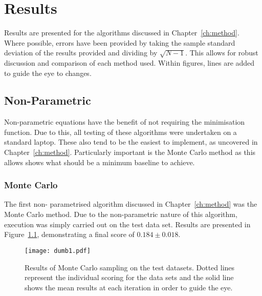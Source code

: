 \chapter{Results}










\graphicspath{{Chapter4/Figs/Vector/}{Chapter4/Figs/}}
Results are presented for the algorithms discussed in Chapter~\ref{ch:method}. Where possible, errors have been provided by taking the sample standard deviation of the results provided and dividing by $\sqrt{N-1}$. This allows for robust discussion and comparison of each method used. Within figures, lines are added to guide the eye to changes.

\section{Non-Parametric}
Non-parametric equations have the benefit of not requiring the minimisation function. Due to this, all testing of these algorithms were undertaken on a standard laptop. These also tend to be the easiest to implement, as uncovered in Chapter~\ref{ch:method}. Particularly important is the Monte Carlo method as this allows shows what should be a minimum baseline to achieve.

\subsection{Monte Carlo}
The first non- parametrised algorithm discussed in Chapter~\ref{ch:method} was the Monte Carlo method. Due to the non-parametric nature of this algorithm, execution was simply carried out on the test data set. Results are presented in Figure~\ref{fig:MCTestSet}, demonstrating a final score of ${0.184\pm{}0.018}$.

\begin{figure}[H]
    \begin{center}
        \texttt{[image: dumb1.pdf]}
        \caption[Monte Carlo]{Results of Monte Carlo sampling on the test datasets. Dotted lines represent the individual scoring for the data sets and the solid line shows the mean results at each iteration in order to guide the eye.}
        \label{fig:MCTestSet}
    \end{center}
\end{figure}

